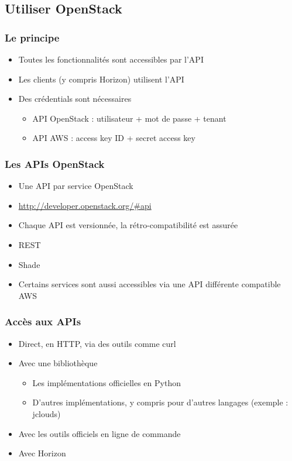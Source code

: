   \subsection[OpenStack son utilisation]{Utiliser OpenStack}

  \begin{frame}
    \frametitle{Le principe}
    \begin{itemize}
      \item Toutes les fonctionnalités sont accessibles par l'API
      \item Les clients (y compris Horizon) utilisent l'API
      \item Des crédentials sont nécessaires
      \begin{itemize}
        \item API OpenStack : utilisateur + mot de passe + tenant
        \item API AWS : access key ID + secret access key
      \end{itemize}
    \end{itemize}
  \end{frame}

  \begin{frame}
    \frametitle{Les APIs OpenStack}
    \begin{itemize}
      \item Une API par service OpenStack
      \item \url{http://developer.openstack.org/\#api}
      \item Chaque API est versionnée, la rétro-compatibilité est assurée
      \item REST
      \item Shade
      \item Certains services sont aussi accessibles via une API différente compatible AWS
    \end{itemize}
  \end{frame}

  \begin{frame}
    \frametitle{Accès aux APIs}
    \begin{itemize}
      \item Direct, en HTTP, via des outils comme curl
      \item Avec une bibliothèque
      \begin{itemize}
        \item Les implémentations officielles en Python
        \item D'autres implémentations, y compris pour d'autres langages (exemple : jclouds)
      \end{itemize}
      \item Avec les outils officiels en ligne de commande
      \item Avec Horizon
    \end{itemize}
  \end{frame}

